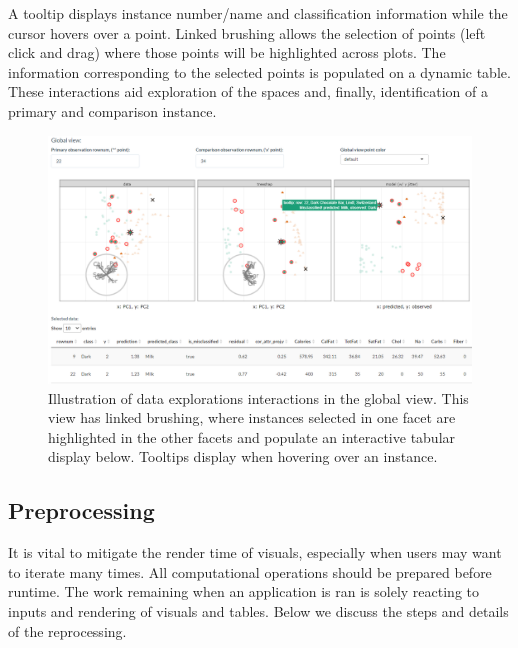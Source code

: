 \documentclass[
]{article}
\begin{document}
A tooltip displays instance number/name and classification information while the cursor hovers over a point. Linked brushing allows the selection of points (left click and drag) where those points will be highlighted across plots. The information corresponding to the selected points is populated on a dynamic table. These interactions aid exploration of the spaces and, finally, identification of a primary and comparison instance.

\begin{figure}

{\centering \includegraphics[width=1\linewidth]{./figures/app_interactions} 

}

\caption{Illustration of data explorations interactions in the global view. This view has linked brushing, where instances selected in one facet are highlighted in the other facets and populate an interactive tabular display below. Tooltips display when hovering over an instance.}\label{fig:interactions}
\end{figure}

\hypertarget{preprocessing}{%
\subsection{Preprocessing}\label{preprocessing}}

It is vital to mitigate the render time of visuals, especially when users may want to iterate many times. All computational operations should be prepared before runtime. The work remaining when an application is ran is solely reacting to inputs and rendering of visuals and tables. Below we discuss the steps and details of the reprocessing.
\end{document}
